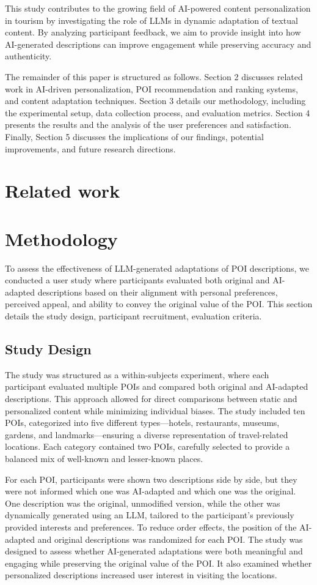 \documentclass[sigconf,review,anonymous]{acmart}
\begin{document}
This study contributes to the growing field of AI-powered content personalization in tourism by investigating the role of LLMs in dynamic adaptation of textual content. By analyzing participant feedback, we aim to provide insight into how AI-generated descriptions can improve engagement while preserving accuracy and authenticity.

The remainder of this paper is structured as follows. Section 2 discusses related work in AI-driven personalization, POI recommendation and ranking systems, and content adaptation techniques. Section 3 details our methodology, including the experimental setup, data collection process, and evaluation metrics. Section 4 presents the results and the analysis of the user preferences and satisfaction. Finally, Section 5 discusses the implications of our findings, potential improvements, and future research directions.

\section{Related work}


\section{Methodology}
To assess the effectiveness of LLM-generated adaptations of POI descriptions, we conducted a user study where participants evaluated both original and AI-adapted descriptions based on their alignment with personal preferences, perceived appeal, and ability to convey the original value of the POI. This section details the study design, participant recruitment, evaluation criteria.

\subsection{Study Design}
The study was structured as a within-subjects experiment, where each participant evaluated multiple POIs and compared both original and AI-adapted descriptions. This approach allowed for direct comparisons between static and personalized content while minimizing individual biases. The study included ten POIs, categorized into five different types—hotels, restaurants, museums, gardens, and landmarks—ensuring a diverse representation of travel-related locations. Each category contained two POIs, carefully selected to provide a balanced mix of well-known and lesser-known places.

For each POI, participants were shown two descriptions side by side, but they were not informed which one was AI-adapted and which one was the original. One description was the original, unmodified version, while the other was dynamically generated using an LLM, tailored to the participant’s previously provided interests and preferences. To reduce order effects, the position of the AI-adapted and original descriptions was randomized for each POI. The study was designed to assess whether AI-generated adaptations were both meaningful and engaging while preserving the original value of the POI. It also examined whether personalized descriptions increased user interest in visiting the locations.
\end{document}

